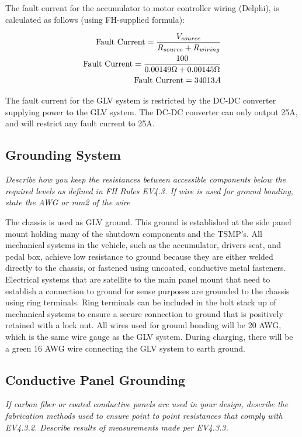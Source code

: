 \documentclass{article}
\begin{document}
The fault current for the accumulator to motor controller wiring (Delphi), is calculated as follows (using FH-supplied formula):

\begin{align}
    \text{Fault Current} = \dfrac{V_{source}}{R_{source} + R_{wiring}}\\
    \text{Fault Current} = \dfrac{100}{0.00149 \ohm + 0.00145 \ohm}\\
    \text{Fault Current} = 34013 A
\end{align}

The fault current for the GLV system is restricted by the DC-DC converter supplying power to the GLV system. The DC-DC converter can only output 25A, and will restrict any fault current to 25A.

\subsection{Grounding System}

\textit{Describe how you keep the resistances between accessible components below the required levels as defined in FH Rules EV4.3. If wire is used for ground bonding, state the AWG or mm2 of the wire}

The chassis is used as GLV ground. This ground is established at the side panel mount holding many of the shutdown components and the TSMP's. All mechanical systems in the vehicle, such as the accumulator, drivers seat, and pedal box, achieve low resistance to ground because they are either welded directly to the chassis, or fastened using uncoated, conductive metal fasteners. Electrical systems that are satellite to the main panel mount that need to establish a connection to ground for sense purposes are grounded to the chassis using ring terminals. Ring terminals can be included in the bolt stack up of mechanical systems to ensure a secure connection to ground that is positively retained with a lock nut. All wires used for ground bonding will be 20 AWG, which is the same wire gauge as the GLV system. During charging, there will be a green 16 AWG wire connecting the GLV system to earth ground.


\subsection{Conductive Panel Grounding}

\textit{If carbon fiber or coated conductive panels are used in your design, describe the fabrication methods used to ensure point to point resistances that comply with EV4.3.2. Describe results of measurements made per EV4.3.3.}
\end{document}
